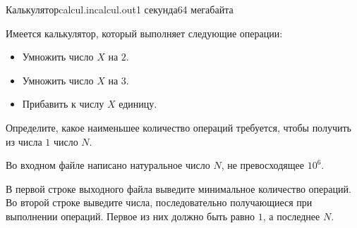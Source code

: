 \begin{problem}{Калькулятор}{calcul.in}{calcul.out}{1 секунда}{64 мегабайта}

Имеется калькулятор, который выполняет следующие операции:

\begin{itemize}
  \item Умножить число $X$ на $2$.
  \item Умножить число $X$ на $3$.
  \item Прибавить к числу $X$ единицу.
\end{itemize}

Определите, какое наименьшее количество операций требуется, чтобы получить из числа $1$ число $N$.

\InputFile

Во входном файле написано натуральное число $N$, не превосходящее $10^6$.

\OutputFile

В первой строке выходного файла выведите минимальное количество операций.
Во второй строке выведите числа, последовательно получающиеся при выполнении операций.
Первое из них должно быть равно $1$, а последнее $N$.

\Examples

\begin{example}
%
%
%
\end{example}

\end{problem}
